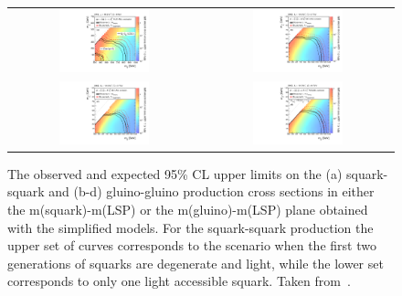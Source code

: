 \begin{figure}[!h]
  \centering
  \begin{tabular}{cc}
                \includegraphics[width=0.49\textwidth]{figures/RA2_Limit1.pdf} &
                \includegraphics[width=0.49\textwidth]{figures/RA2_Limit2.pdf} \\
                \includegraphics[width=0.49\textwidth]{figures/RA2_Limit3.pdf} &
                \includegraphics[width=0.49\textwidth]{figures/RA2_Limit4.pdf} \\
  \end{tabular}
\caption{The observed and expected 95\% CL upper limits on the (a) squark-squark and (b-d) gluino-gluino production cross sections in either the m(squark)-m(LSP) or the m(gluino)-m(LSP) plane obtained with the simplified models. For the squark-squark production the upper set of curves corresponds to the scenario when the first two generations of squarks are degenerate and light, while the lower set corresponds to only one light accessible squark. Taken from~\cite{Chatrchyan:2014lfa}.} 
  \label{fig:ra2_limits}
\end{figure}

